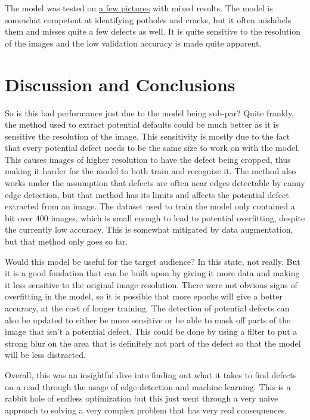 \documentclass[12pt, letterpaper, twoside]{article}
\begin{document}
The model was tested on \hyperref[app:result_image]{a few pictures} with mixed results. 
The model is somewhat competent at identifying potholes and cracks, but it often mislabels them and misses quite a few defects as well.
It is quite sensitive to the resolution of the images and the low validation accuracy is made quite apparent.

\section{Discussion and Conclusions}\label{sec:conc}

So is this bad performance just due to the model being sub-par? 
Quite frankly, the method used to extract potential defaults could be much better as it is sensitive the resolution of the image.
This sensitivity is mostly due to the fact that every potential defect needs to be the same size to work on with the model.
This causes images of higher resolution to have the defect being cropped, 
thus making it harder for the model to both train and recognize it.
The method also works under the assumption that defects are often near edges detectable by canny edge detection, 
but that method has its limits and affects the potential defect extracted from an image.
The dataset used to train the model only contained a bit over 400 images, 
which is small enough to lead to potential overfitting, despite the currently low accuracy.
This is somewhat mitigated by data augmentation, but that method only goes so far.

Would this model be useful for the target audience?
In this state, not really.
But it is a good fondation that can be built upon by giving it more data and making it less sensitive to the original image resolution.
There were not obvious signs of overfitting in the model, 
so it is possible that more epochs will give a better accuracy,
at the cost of longer training.
The detection of potential defects can also be updated to either be more sensitive or be able to mask off parts of the image that isn't a potential defect.
This could be done by using a filter to put a strong blur on the area that is definitely not part of the defect so that the model will be less distracted.

Overall, this was an insightful dive into finding out what it takes to find defects on a road through the usage of edge detection and machine learning.
This is a rabbit hole of endless optimization but this just went through a very naive approach to solving a very complex problem that has very real consequences.
\end{document}
